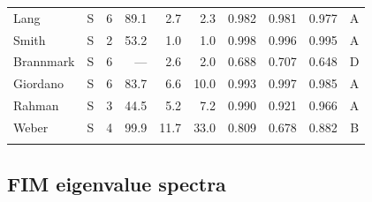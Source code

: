 \documentclass[pdflatex,sn-nature]{sn-jnl}
\begin{document}
\begin{table}[t]
\begin{tabular}{@{}llrrrrrrr c@{}}
Lang & S & 6 & 89.1 & 2.7 & 2.3 & 0.982 & 0.981 & 0.977 & A \\
Smith & S & 2 & 53.2 & 1.0 & 1.0 & 0.998 & 0.996 & 0.995 & A \\
Brannmark & S & 6 & --- & 2.6 & 2.0 & 0.688 & 0.707 & 0.648 & D \\
Giordano & S & 6 & 83.7 & 6.6 & 10.0 & 0.993 & 0.997 & 0.985 & A \\
Rahman & S & 3 & 44.5 & 5.2 & 7.2 & 0.990 & 0.921 & 0.966 & A \\
Weber & S & 4 & 99.9 & 11.7 & 33.0 & 0.809 & 0.678 & 0.882 & B \\
\botrule
\end{tabular}
\end{table}

\subsection{FIM eigenvalue spectra}\label{sec:spectra}
\end{document}
